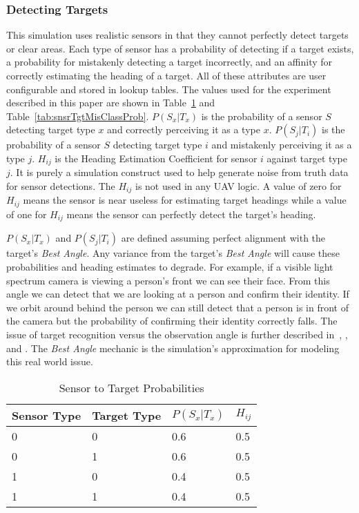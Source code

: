 \subsubsection{Detecting Targets}
\label{sec:sensor_var_descriptions}
This simulation uses realistic sensors in that they cannot perfectly detect targets or clear areas.  Each type of sensor has a probability of detecting if a target exists, a probability for mistakenly detecting a target incorrectly, and an affinity for correctly estimating the heading of a target.  All of these attributes are user configurable and stored in lookup tables.  The values used for the experiment described in this paper are shown in Table~\ref{tab:snsrTgtProb} and Table~\ref{tab:snsrTgtMisClassProb}.  $P(S_{x}|T_{x})$ is the probability of a sensor $S$ detecting target type $x$ and correctly perceiving it as a type $x$.  $P(S_{j}|T_{i})$ is the probability of a sensor $S$ detecting target type $i$ and mistakenly perceiving it as a type $j$.  $H_{ij}$ is the Heading Estimation Coefficient for sensor $i$ against target type $j$.  It is purely a simulation construct used to help generate noise from truth data for sensor detections.  The $H_{ij}$ is not used in any UAV logic.  A value of zero for $H_{ij}$ means the sensor is near useless for estimating target headings while a value of one for $H_{ij}$ means the sensor can perfectly detect the target's heading.

$P(S_{x}|T_{x})$ and $P(S_{j}|T_{i})$ are defined assuming perfect alignment with the target's \textit{Best Angle}.  Any variance from the target's \textit{Best Angle} will cause these probabilities and heading estimates to degrade.  For example, if a visible light spectrum camera is viewing a person's front we can see their face.  From this angle we can detect that we are looking at a person and confirm their identity.  If we orbit around behind the person we can still detect that a person is in front of the camera but the probability of confirming their identity correctly falls.  The issue of target recognition versus the observation angle is further described in~\textcite{min_risk_angle}, \textcite{min_angle_res_vs_regard}, and \textcite{accuracy_2d_geometry}.  The \textit{Best Angle} mechanic is the simulation's approximation for modeling this real world issue.

\begin{table}[H]
	\caption{Sensor to Target Probabilities}
	\centering
	\label{tab:snsrTgtProb}
	\begin{tabular}{|p{1.2cm}|p{1.2cm}|p{1.5cm}|p{1cm}|}
		\hline
		Sensor Type & Target Type & $P(S_{x}|T_{x})$ & $H_{ij}$\\ \hline
		0 & 0 & 0.6 & 0.5 \\  \hline
		0 & 1 & 0.6 & 0.5 \\  \hline
		1 & 0 & 0.4 & 0.5 \\  \hline
		1 & 1 & 0.4 & 0.5 \\  \hline
	\end{tabular}
\end{table}

